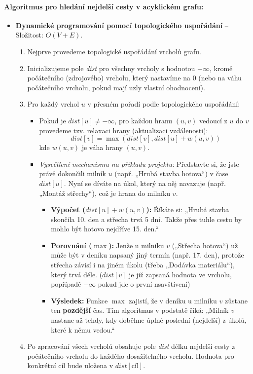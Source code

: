 \paragraph*{Algoritmus pro hledání nejdelší cesty v acyklickém grafu:}
\begin{itemize}
\item \textbf{Dynamické programování pomocí topologického uspořádání} -- Složitost: $O(V + E)$.
\begin{enumerate}
    \item Nejprve provedeme topologické uspořádání vrcholů grafu.
    \item Inicializujeme pole \textit{dist} pro všechny vrcholy s hodnotou $-\infty$, kromě počátečního (zdrojového) vrcholu, který nastavíme na $0$ (nebo na váhu počátečního vrcholu, pokud mají uzly vlastní ohodnocení).
    \item Pro každý vrchol $u$ v přesném pořadí podle topologického uspořádání:
    \begin{itemize}
        \item Pokud je $dist[u] \neq -\infty$, pro každou hranu $(u, v)$ vedoucí z $u$ do $v$ provedeme tzv. relaxaci hrany (aktualizaci vzdálenosti): 
        \[ dist[v] = \max(dist[v], dist[u] + w(u, v)) \]
        kde $w(u, v)$ je váha hrany $(u, v)$.
        \item \textit{Vysvětlení mechanismu na příkladu projektu:}
Představte si, že jste právě dokončili milník $u$ (např. „Hrubá stavba hotova“) v čase $dist[u]$. Nyní se díváte na úkol, který na něj navazuje (např. „Montáž střechy“), což je hrana do milníku $v$.
\begin{itemize}
    \item \textbf{Výpočet ($dist[u] + w(u, v)$):} Říkáte si: „Hrubá stavba skončila 10. den a střecha trvá 5 dní. Takže přes tuhle cestu by mohlo být hotovo nejdříve 15. den.“
    \item \textbf{Porovnání ($\max$):} Jenže u milníku $v$ („Střecha hotova“) už může být v deníku napsaný jiný termín (např. 17. den), protože střecha závisí i na jiném úkolu (třeba „Dodávka materiálu“), který trvá déle. ($dist[v]$ je již zapsaná hodnota ve vrcholu, popřípadě $-\infty$ pokud jde o první nsavštívení)
    \item \textbf{Výsledek:} Funkce $\max$ zajistí, že v deníku u milníku $v$ zůstane ten \textbf{pozdější} čas. Tím algoritmus v podstatě říká: „Milník $v$ nastane až tehdy, kdy doběhne úplně poslední (nejdelší) z úkolů, které k němu vedou.“ 
\end{itemize}
    \end{itemize}
    \item Po zpracování všech vrcholů obsahuje pole \textit{dist} délku nejdelší cesty z počátečního vrcholu do každého dosažitelného vrcholu. Hodnota pro konkrétní cíl bude uložena v $dist[\text{cíl}]$.
\end{enumerate}
\end{itemize}

